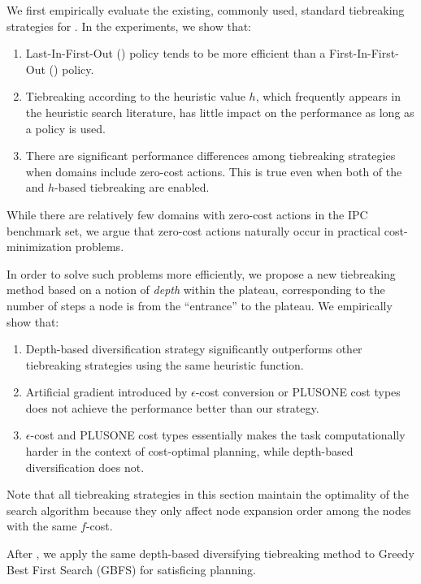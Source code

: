 We first empirically evaluate the existing, commonly used, standard
tiebreaking strategies for \astar.
In the experiments, we show that:
\begin{enumerate}
 \item Last-In-First-Out (\lifo) policy tends to be more efficient
       than a First-In-First-Out (\fifo) policy.
 \item Tiebreaking according to the heuristic value $h$, which
       frequently appears in the heuristic search literature, has little
       impact on the performance as long as a \lifo policy is used.
 \item There are significant performance differences among tiebreaking strategies
       when domains include zero-cost actions. This is true even when
       both of the \lifo and $h$-based tiebreaking are enabled.
\end{enumerate}
While there are relatively few domains with zero-cost actions in the
IPC benchmark set, we argue that zero-cost actions naturally occur in 
practical cost-minimization problems.

In order to solve such problems more efficiently, we propose a new
tiebreaking method based on a notion of \emph{depth} within the plateau,
corresponding to the number of steps a node is from the ``entrance'' to
the plateau.  We empirically show that:
\begin{enumerate}
 \item Depth-based diversification strategy significantly outperforms
       other tiebreaking strategies using the same heuristic function.
 \item Artificial gradient introduced by $\epsilon$-cost conversion or
       PLUS\-ONE cost types does not achieve the performance better than
       our strategy.
 \item $\epsilon$-cost and PLUS\-ONE cost types essentially makes the
       task computationally harder in the context of cost-optimal
       planning, while depth-based diversification does not.
\end{enumerate}

Note that all tiebreaking strategies in this section maintain the
optimality of the search algorithm because they only affect node
expansion order among the nodes with the same $f$-cost.


After , we apply the same depth-based diversifying tiebreaking
method to Greedy Best First Search (GBFS) for satisficing planning.

